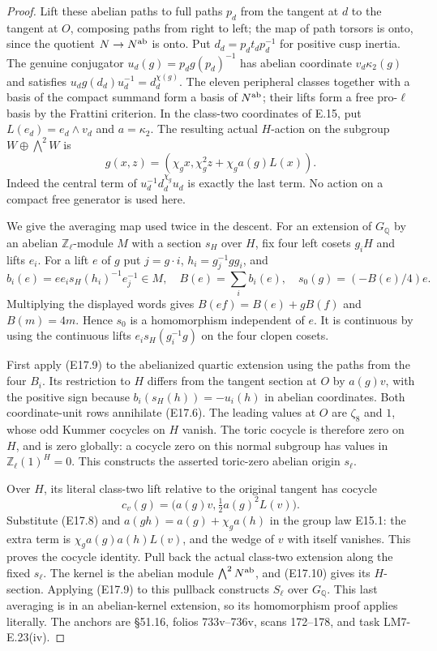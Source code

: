 \documentclass[11pt,oneside]{article}
\begin{document}
\begin{proof}
Lift these abelian paths to full paths $p_d$ from
the tangent at $d$ to the tangent at $O$, composing
paths from right to left; the
map of path torsors is onto, since the quotient
$N\to N^{\rm ab}$ is onto. Put
$d_d=p_dt_dp_d^{-1}$ for positive cusp inertia.
The genuine conjugator $u_d(g)=p_dg(p_d)^{-1}$ has
abelian coordinate $v_d\kappa_2(g)$ and satisfies
$u_dg(d_d)u_d^{-1}=d_d^{\chi(g)}$.
The eleven peripheral classes together with a basis
of the compact summand form a basis of $N^{\rm ab}$;
their lifts form a free pro-$\ell$ basis by the
Frattini criterion. In the class-two coordinates of
E.15, put $L(e_d)=e_d\wedge v_d$ and $a=\kappa_2$.
The resulting actual $H$-action on the subgroup
$W\oplus\bigwedge^2W$ is
\[
 g(x,z)=(\chi_gx,\chi_g^2z+\chi_ga(g)L(x)).
 \tag{E17.8}
\]
Indeed the central term of
$u_d^{-1}d_d^{\chi_g}u_d$ is exactly the last term.
No action on a compact free generator is used here.

We give the averaging map used twice in the descent.
For an extension of $G_{\mathbb Q}$ by an abelian
$\mathbb Z_\ell$-module $M$ with a section $s_H$
over $H$, fix four left cosets $g_iH$ and lifts $e_i$.
For a lift $e$ of $g$ put $j=g\cdot i$,
$h_i=g_j^{-1}gg_i$, and
\[
 b_i(e)=e e_i s_H(h_i)^{-1}e_j^{-1}\in M,
 \quad B(e)=\sum_i b_i(e),
 \quad s_0(g)=(-B(e)/4)e .
 \tag{E17.9}
\]
Multiplying the displayed words gives
$B(ef)=B(e)+gB(f)$ and $B(m)=4m$.
Hence $s_0$ is a homomorphism independent of $e$.
It is continuous by using the continuous lifts
$e_i s_H(g_i^{-1}g)$ on the four clopen cosets.

First apply (E17.9) to the abelianized quartic
extension using the paths from the four $B_i$.
Its restriction to $H$ differs from the tangent
section at $O$ by $a(g)v$, with the positive sign
because $b_i(s_H(h))=-u_i(h)$ in abelian coordinates.
Both coordinate-unit rows annihilate (E17.6).
The leading values at $O$ are $\zeta_8$ and $1$,
whose odd Kummer cocycles on $H$ vanish. The toric
cocycle is therefore zero on $H$, and is zero
globally: a cocycle zero on this normal subgroup
has values in $\mathbb Z_\ell(1)^{H}=0$.
This constructs the asserted toric-zero abelian
origin $s_\ell$.

Over $H$, its literal class-two lift relative to
the original tangent has cocycle
\[
 c_v(g)=\bigl(a(g)v,\tfrac12a(g)^2L(v)\bigr).
 \tag{E17.10}
\]
Substitute (E17.8) and
$a(gh)=a(g)+\chi_ga(h)$ in the group law E15.1:
the extra term is
$\chi_ga(g)a(h)L(v)$, and the wedge of $v$ with
itself vanishes. This proves the cocycle identity.
Pull back the actual class-two extension along the
fixed $s_\ell$. The kernel is the abelian module
$\bigwedge^2N^{\rm ab}$, and (E17.10) gives its
$H$-section. Applying (E17.9) to this pullback
constructs $S_\ell$ over $G_{\mathbb Q}$.
This last averaging is in an abelian-kernel
extension, so its homomorphism proof applies
literally. The anchors are \S51.16, folios
733v--736v, scans 172--178, and task LM7-E.23(iv).
\end{proof}
\end{document}
